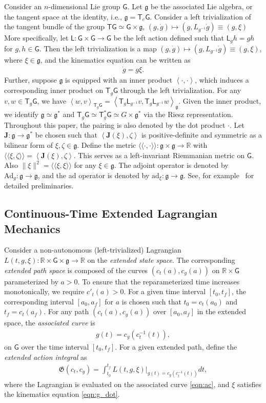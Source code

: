 \documentclass[letterpaper, 10pt, conference]{ieeeconf}
\newcommand{\G}{\ensuremath{\mathsf{G}}}
\newcommand{\T}{\ensuremath{\mathsf{T}}}
\renewcommand{\L}{\ensuremath{\mathsf{L}}}
\renewcommand{\Re}{\ensuremath{\mathbb{R}}}
\newcommand{\pair}[1]{\ensuremath{\left\langle #1 \right\rangle}}
\newcommand{\met}[1]{\ensuremath{\langle\!\langle #1 \rangle\!\rangle}}
\newcommand{\Ad}{\ensuremath{\mathrm{Ad}}}
\newcommand{\ad}{\ensuremath{\mathrm{ad}}}
\newcommand{\g}{\ensuremath{\mathfrak{g}}}
\begin{document}
Consider  an $n$-dimensional Lie group $\G$.
Let $\g$ be the associated Lie algebra, or the tangent space at the identity, i.e., $\g = \T_e\G$.
Consider a left trivialization of the tangent bundle of the group $\T\G \simeq \G\times \g$, $(g,\dot g)\mapsto (g, L_{g^{-1}}\dot g)\equiv(g,\xi)$
More specifically, let $\L:\G\times\G\rightarrow\G$ be the left action defined such that $\L_g h = gh$ for $g,h\in\G$.
Then the left trivialization is a map $(g,\dot g)\mapsto (g, L_{g^{-1}}\dot g)\equiv(g,\xi)$, where $\xi\in\g$, and the kinematics equation can be written as
\begin{align}
    \dot g = g\xi. \label{eqn:g_dot}
\end{align}
Further, suppose $\g$ is equipped with an inner product $\pair{\cdot, \cdot}$, which induces a corresponding inner product on $\T_g\G$ through the left trivialization.
For any $v,w\in\T_g\G$, we have $\pair{w,v}_{\T_g\G} = \pair{ \T_g \L_{g^{-1}} v, \T_g \L_{g^{-1}} w}_\g$. 
Given the inner product, we identify $\g\simeq \g^*$ and $\T_g \G \simeq \T^*_g \G\simeq G\times \g^*$ via the Riesz representation. Throughout this paper, the pairing is also denoted by the dot product $\cdot$.
Let $\mathbf{J}:\g\rightarrow\g^*$ be chosen such that $\pair{\mathbf{J}(\xi),\zeta}$ is positive-definite and symmetric as a bilinear form of $\xi,\zeta\in\g$.
Define the metric $\met{\cdot,\cdot}:\g\times\g\rightarrow\Re$ with $\met{\xi,\zeta} = \pair{\mathbf{J}(\xi),\zeta}$.
This serves as a left-invariant Riemmanian metric on $\G$.
Also $\|\xi\|^2 = \met{\xi,\xi}$ for any $\xi\in\g$.
The adjoint operator is denoted by $\Ad_g:\g\rightarrow\g$, and the ad operator is denoted by $\ad_\xi:\g\rightarrow\g$. See, for example~\cite{MarRat99} for detailed preliminaries. 

\subsection{Continuous-Time Extended Lagrangian Mechanics}

Consider a non-autonomous (left-trivialized) Lagrangian $L(t,g,\xi):\Re\times\G\times\g\rightarrow \Re$ on the \textit{extended state space}.
The corresponding \textit{extended path space} is composed of the curves $(c_t(a),c_g(a))$ on $\Re\times \G$ parameterized by $a>0$.
To ensure that the reparameterized time increases monotonically, we require $c'_t(a) > 0$. 
For a given time interval $[t_0,t_f]$, the corresponding interval $[a_0,a_f]$ for $a$ is chosen such that $t_0=c_t(a_0)$ and $t_f=c_t(a_f)$.
For any path $(c_t(a),c_g(a))$ over $[a_0,a_f]$ in the extended space, the \textit{associated curve} is 
\begin{align}
    g(t) = c_g(c_t^{-1}(t)),\label{eqn:ac}
\end{align}
on $\G$ over the time interval $[t_0,t_f]$.
For a given extended path, define the \textit{extended action integral} as
\begin{align}
    \mathfrak{G}(c_t,c_g) = \int_{t_0}^{t_f} L(t,g,\xi)\bigg|_{g(t) = c_g(c_t^{-1}(t))} dt,\label{eqn:AI}
\end{align}
where the Lagrangian is evaluated on the associated curve \eqref{eqn:ac}, and $\xi$ satisfies the kinematics equation  \eqref{eqn:g_dot}.
\end{document}
